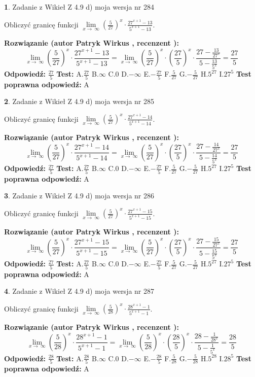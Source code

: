 \documentclass[12pt, a4paper]{article}
\theoremstyle{definition} %
\newtheorem{zad}{}
\newcommand{\zadStart}[1]{\begin{zad}#1\newline}
\newcommand{\zadStop}{\end{zad}}
\newcommand{\rozwStart}[2]{\noindent \textbf{Rozwiązanie (autor #1 , recenzent #2): }\newline}
\newcommand{\rozwStop}{\newline}
\newcommand{\odpStart}{\noindent \textbf{Odpowiedź:}\newline}
\newcommand{\odpStop}{\newline}
\newcommand{\testStart}{\noindent \textbf{Test:}\newline}
\newcommand{\testStop}{\newline}
\newcommand{\kluczStart}{\noindent \textbf{Test poprawna odpowiedź:}\newline}
\newcommand{\kluczStop}{\newline}
\begin{document}
\zadStart{Zadanie z Wikieł Z 4.9 d) moja wersja nr 284}


Obliczyć granicę funkcji  $\lim\limits_{x\to\ \infty}(\frac{5}{27})^{x}\cdot\frac{27^{x+1}-13}{5^{x+1}-13}$.
\zadStop
\rozwStart{Patryk Wirkus}{}
$$\lim\limits_{x\to\ \infty}(\frac{5}{27})^{x}\cdot\frac{27^{x+1}-13}{5^{x+1}-13}=\lim\limits_{x\to\ \infty}(\frac{5}{27})^{x}\cdot(\frac{27}{5})^{x} \cdot \frac{27-\frac{13}{27^{x}}}{5-\frac{13}{5^{x}}} = \frac{27}{5}$$
\rozwStop
\odpStart
$\frac{27}{5}$
\odpStop
\testStart
A.$\frac{27}{5}$ B.$\infty$ C.$0$ D.$-\infty$ E.$-\frac{27}{5}$
F.$\frac{5}{27}$ G.$-\frac{5}{27}$
H.$5^{27}$
I.$27^{5}$
\testStop
\kluczStart
A
\kluczStop



\zadStart{Zadanie z Wikieł Z 4.9 d) moja wersja nr 285}


Obliczyć granicę funkcji  $\lim\limits_{x\to\ \infty}(\frac{5}{27})^{x}\cdot\frac{27^{x+1}-14}{5^{x+1}-14}$.
\zadStop
\rozwStart{Patryk Wirkus}{}
$$\lim\limits_{x\to\ \infty}(\frac{5}{27})^{x}\cdot\frac{27^{x+1}-14}{5^{x+1}-14}=\lim\limits_{x\to\ \infty}(\frac{5}{27})^{x}\cdot(\frac{27}{5})^{x} \cdot \frac{27-\frac{14}{27^{x}}}{5-\frac{14}{5^{x}}} = \frac{27}{5}$$
\rozwStop
\odpStart
$\frac{27}{5}$
\odpStop
\testStart
A.$\frac{27}{5}$ B.$\infty$ C.$0$ D.$-\infty$ E.$-\frac{27}{5}$
F.$\frac{5}{27}$ G.$-\frac{5}{27}$
H.$5^{27}$
I.$27^{5}$
\testStop
\kluczStart
A
\kluczStop



\zadStart{Zadanie z Wikieł Z 4.9 d) moja wersja nr 286}


Obliczyć granicę funkcji  $\lim\limits_{x\to\ \infty}(\frac{5}{27})^{x}\cdot\frac{27^{x+1}-15}{5^{x+1}-15}$.
\zadStop
\rozwStart{Patryk Wirkus}{}
$$\lim\limits_{x\to\ \infty}(\frac{5}{27})^{x}\cdot\frac{27^{x+1}-15}{5^{x+1}-15}=\lim\limits_{x\to\ \infty}(\frac{5}{27})^{x}\cdot(\frac{27}{5})^{x} \cdot \frac{27-\frac{15}{27^{x}}}{5-\frac{15}{5^{x}}} = \frac{27}{5}$$
\rozwStop
\odpStart
$\frac{27}{5}$
\odpStop
\testStart
A.$\frac{27}{5}$ B.$\infty$ C.$0$ D.$-\infty$ E.$-\frac{27}{5}$
F.$\frac{5}{27}$ G.$-\frac{5}{27}$
H.$5^{27}$
I.$27^{5}$
\testStop
\kluczStart
A
\kluczStop



\zadStart{Zadanie z Wikieł Z 4.9 d) moja wersja nr 287}


Obliczyć granicę funkcji  $\lim\limits_{x\to\ \infty}(\frac{5}{28})^{x}\cdot\frac{28^{x+1}-1}{5^{x+1}-1}$.
\zadStop
\rozwStart{Patryk Wirkus}{}
$$\lim\limits_{x\to\ \infty}(\frac{5}{28})^{x}\cdot\frac{28^{x+1}-1}{5^{x+1}-1}=\lim\limits_{x\to\ \infty}(\frac{5}{28})^{x}\cdot(\frac{28}{5})^{x} \cdot \frac{28-\frac{1}{28^{x}}}{5-\frac{1}{5^{x}}} = \frac{28}{5}$$
\rozwStop
\odpStart
$\frac{28}{5}$
\odpStop
\testStart
A.$\frac{28}{5}$ B.$\infty$ C.$0$ D.$-\infty$ E.$-\frac{28}{5}$
F.$\frac{5}{28}$ G.$-\frac{5}{28}$
H.$5^{28}$
I.$28^{5}$
\testStop
\kluczStart
A
\kluczStop
\end{document}

